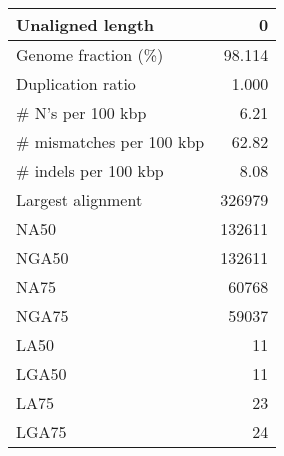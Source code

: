 \documentclass[12pt,a4paper]{article}
\begin{document}
\begin{table}[ht]
\begin{center}
\begin{tabular}{|l*{1}{|r}|}
Unaligned length & 0 \\ \hline
Genome fraction (\%) & 98.114 \\ \hline
Duplication ratio & 1.000 \\ \hline
\# N's per 100 kbp & 6.21 \\ \hline
\# mismatches per 100 kbp & 62.82 \\ \hline
\# indels per 100 kbp & 8.08 \\ \hline
Largest alignment & 326979 \\ \hline
NA50 & 132611 \\ \hline
NGA50 & 132611 \\ \hline
NA75 & 60768 \\ \hline
NGA75 & 59037 \\ \hline
LA50 & 11 \\ \hline
LGA50 & 11 \\ \hline
LA75 & 23 \\ \hline
LGA75 & 24 \\ \hline
\end{tabular}
\end{center}
\end{table}
\end{document}
